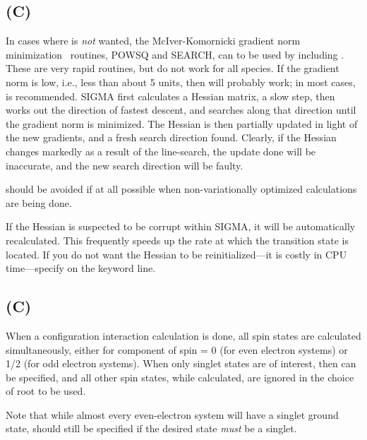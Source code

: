 \subsection*{ (C)}
In cases where  is {\em not} wanted, the McIver-Komornicki
gradient norm minimization~\cite{sigma1,sigma2}
routines, POWSQ and
SEARCH, can  to  be used by including .  These are
very rapid routines, but do not work
for all species.  If the gradient norm is low, i.e., less  than  about  5
units,   then     will  probably  work;  in  most  cases,    is
recommended.  SIGMA first calculates a  Hessian  matrix,  a
slow  step,  then works out the direction of fastest descent, and searches
along that direction until the gradient norm is minimized.   The  Hessian
is  then  partially  updated  in  light of the new gradients, and a fresh
search direction found.  Clearly, if the Hessian changes  markedly  as  a
result  of  the  line-search, the update done will be inaccurate, and the
new search direction will be faulty.

         should be avoided if at all  possible  when  non-variationally
   optimized calculations are being done.

        If the Hessian is suspected to be corrupt within SIGMA, it  will  be
   automatically  recalculated.  This frequently speeds up the rate at which
   the transition state is located.  If you do not want the  Hessian  to  be
   reinitialized---it is costly in CPU time---specify  on the keyword
   line.

\subsection*{ (C)}
        When a configuration  interaction  calculation  is  done,  all  spin
   states are calculated simultaneously, either for component of spin = 0 (for even
electron systems) or 1/2 (for odd electron systems).  When only
singlet states are  of  interest,  then    can  be
   specified,  and  all  other spin states, while calculated, are ignored in
   the choice of root to be used.

        Note that while  almost  every  even-electron  system  will  have  a
   singlet  ground  state,   should still be specified if the desired
   state {\em must} be a singlet.

